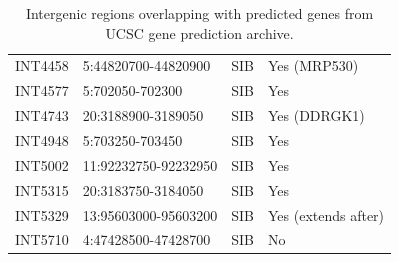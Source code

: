 \begin{table}[htbp]
\begin{tabular}{llll}
	INT4458 & 5:44820700-44820900 & SIB & Yes (MRP530) \\
	INT4577 & 5:702050-702300 & SIB & Yes \\
	INT4743 & 20:3188900-3189050 & SIB & Yes (DDRGK1) \\
	INT4948 & 5:703250-703450 & SIB & Yes \\
	INT5002 & 11:92232750-92232950 & SIB & Yes \\
	INT5315 & 20:3183750-3184050 & SIB & Yes \\
	INT5329 & 13:95603000-95603200 & SIB & Yes (extends after) \\
	INT5710 & 4:47428500-47428700 & SIB & No \\
        \bottomrule
    \end{tabular}
    \caption{Intergenic regions overlapping with predicted genes from UCSC gene prediction archive.}
    \label{tab:predictionToolsIntergenic}
\end{table}
